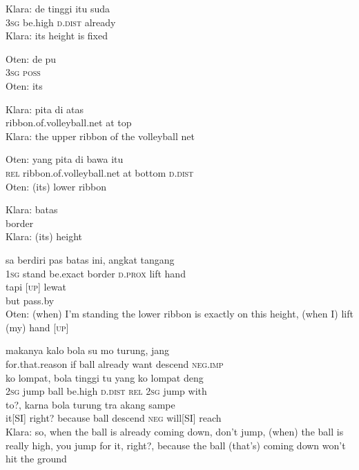 \ea
\gll   Klara:   de   tinggi   itu   suda\\
 {}    \textsc{3sg}   be.high   \textsc{d.dist}   already\\
\glt
Klara: its height is fixed
\z

\ea
\gll   Oten:   de   pu\\
 {}  \textsc{3sg}   \textsc{poss}\\
\glt
Oten: its
\z

\ea
\gll   Klara:   pita   di   atas\\
  {}   ribbon.of.volleyball.net   at   top\\
\glt
Klara: the upper ribbon of the volleyball net
\z

\ea
\gll   Oten:   yang   pita   di   bawa   itu\\
{}     \textsc{rel}   ribbon.of.volleyball.net   at   bottom   \textsc{d.dist}\\
\glt
Oten: (its) lower ribbon
\z

\ea
\gll   Klara:   batas\\
{}     border\\
\glt
Klara: (its) height
\z

\ea
{}    {sa}   berdiri   pas   batas   ini,   angkat   tangang\\
   {}    {\textsc{1sg}}   stand   be.exact   border   \textsc{d.prox}   lift   hand\\
\gll  tapi    {\upshape\textsc{[up]}}    {lewat}\\
  but    {}    {pass.by}\\
\glt
Oten: (when) I’m standing the lower ribbon is exactly on this height, (when I) lift (my) hand [\textsc{up}]
\z

\ea
{}    {makanya}    {kalo}    {bola}    {su}    {mo}    {turung,}    {jang}\\
   {}    {for.that.reason}    {if}    {ball}    {already}    {want}    {descend}    {\textsc{neg.imp}}\\
\gll  ko    {lompat,}    {bola}    {tinggi}    {tu}    {yang}    {ko}    {lompat}   deng\\
  \textsc{2sg}    {jump}    {ball}    {be.high}    {\textsc{d.dist}}    {\textsc{rel}}    {\textsc{2sg}}    {jump}   with\\
    {to?,}    {karna}    {bola}    {turung}    {tra}    {akang}    {sampe}\\
   {it[SI]}    {right?}    {because}    {ball}    {descend}    {\textsc{neg}}    {will[SI]}    {reach}\\
\glt
Klara: so, when the ball is already coming down, don’t jump, (when) the ball is really high, you jump for it, right?, because the ball (that’s) coming down won’t hit the ground
\z

